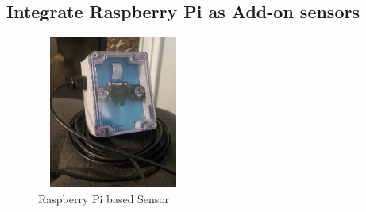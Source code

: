 \documentclass[10pt, a4paper]{article}
\begin{document}
\subsection{Integrate Raspberry Pi as Add-on sensors}
 \begin{figure}[!ht]
  \centering
    \includegraphics[width=5cm, height=5cm]{pi-encloser.jpg}
  \caption{Raspberry Pi based Sensor}
\end{figure}
\end{document}
